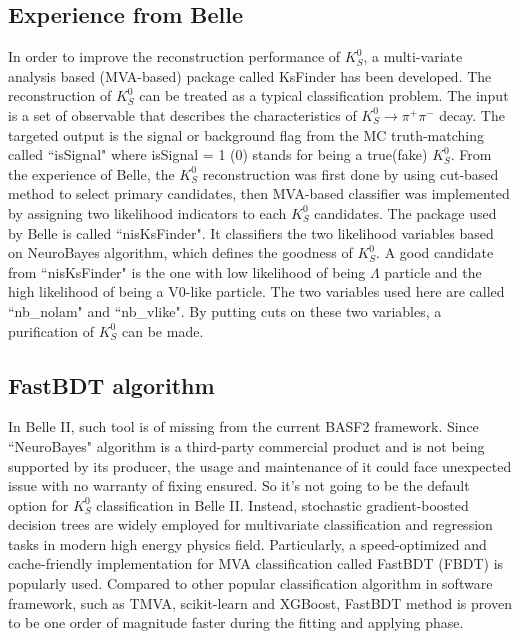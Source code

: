 \subsection{Experience from Belle}
In order to improve the reconstruction performance of $K_S^0$, a multi-variate analysis based (MVA-based) package called KsFinder has been developed. The reconstruction of $K_S^0$ can be treated as a typical classification problem. The input is a set of observable that describes the characteristics of $K_S^0 \to \pi^+ \pi^-$ decay. The targeted output is the signal or background flag from the MC truth-matching called ``isSignal" where isSignal = 1 (0) stands for being a true(fake) $K_S^0$. From the experience of Belle, the $K_S^0$ reconstruction was first done by using cut-based method to select primary candidates, then MVA-based classifier was implemented by assigning two likelihood indicators to each $K_S^0$ candidates. The package used by Belle is called ``nisKsFinder"\cite{b2book}. It classifiers the two likelihood variables based on NeuroBayes algorithm, which defines the goodness of $K_S^0$. A good candidate from ``nisKsFinder" is the one with low likelihood of being $\Lambda$ particle and the high likelihood of being a V0-like particle. The two variables used here are called ``nb\_nolam" and ``nb\_vlike". By putting cuts on these two variables, a purification of $K_S^0$ can be made. 


\subsection{FastBDT algorithm}
In Belle II, such tool is of missing from the current BASF2 framework. Since ``NeuroBayes" algorithm is a third-party commercial product and is not being supported by its producer, the usage and maintenance of it could face unexpected issue with no warranty of fixing ensured. So it's not going to be the default option for $K_S^0$ classification in Belle II. Instead,  stochastic gradient-boosted decision trees are widely employed for multivariate classification and regression tasks in modern high energy physics field. Particularly, a speed-optimized and cache-friendly
implementation for MVA classification called FastBDT (FBDT) is popularly used. Compared to other popular classification algorithm in software framework, such as TMVA, scikit-learn and XGBoost, FastBDT method is proven to be one order of magnitude faster during the fitting  and applying phase. 


